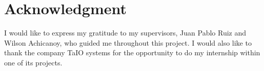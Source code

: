 \documentclass[journal]{IEEEtran}	%
\begin{document}
\section*{Acknowledgment}
I would like to express my gratitude to my supervisors, Juan Pablo Ruiz and Wilson Achicanoy, who guided me throughout this project. I would also like to thank the company TaIO systems for the opportunity to do my internship within one of its projects.

\end{document}
